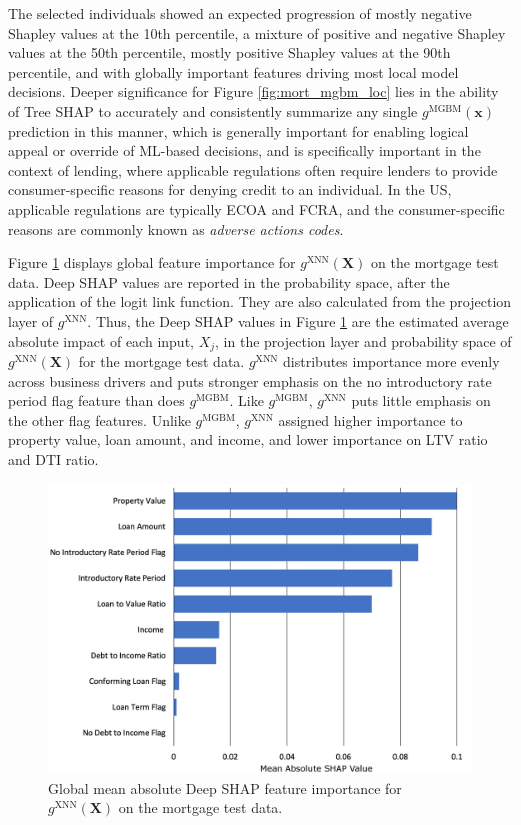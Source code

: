 \documentclass[information,article,accept,moreauthors,pdftex]{Definitions/mdpi}
\begin{document}
{{{  The selected individuals showed an expected progression of mostly negative Shapley values at the 10{th} percentile, a mixture of positive and negative Shapley values at the 50{th} percentile, mostly positive Shapley values at the 90{th} percentile, and with globally important features driving most local model decisions. Deeper significance for Figure \ref{fig:mort_mgbm_loc} lies in the ability of Tree SHAP to accurately and consistently summarize any single $g^\text{MGBM}(\mathbf{x})$ prediction in this manner, which is generally important for enabling logical appeal or override of ML-based decisions, and is specifically important in the context of lending, where applicable regulations often require lenders to provide consumer-specific reasons for denying credit to an individual. In the US, applicable regulations are typically ECOA and FCRA, and the consumer-specific reasons are commonly known as \textit{adverse actions codes}.

Figure \ref{fig:mort_xnn_glob} displays global feature importance for $g^\text{XNN}(\mathbf{X})$ on the mortgage test data. Deep SHAP values are reported in the probability space, after the application of the logit link function. They are also calculated from the projection layer of $g^\text{XNN}$. Thus, the Deep SHAP values in Figure \ref{fig:mort_xnn_glob} are the estimated average absolute impact of each input, $X_j$, in the projection layer and probability space of $g^\text{XNN}(\mathbf{X})$ for the mortgage test data. $g^\text{XNN}$ distributes importance more evenly across business drivers and puts stronger emphasis on the no introductory rate period flag feature than does $g^\text{MGBM}$. Like $g^\text{MGBM}$, $g^\text{XNN}$ puts little emphasis on the other flag features.  Unlike $g^\text{MGBM}$, $g^\text{XNN}$ assigned higher importance to property value, loan amount, and income, and lower importance on LTV ratio and DTI ratio.  

\begin{figure}[H]
\centering
\includegraphics[width=12cm]{img/mort_xnn_glob.png}
\caption{Global mean absolute Deep SHAP feature importance for $g^\text{XNN}(\mathbf{X})$ on the mortgage test data.}
\label{fig:mort_xnn_glob}
\end{figure} 



}}}
\end{document}
